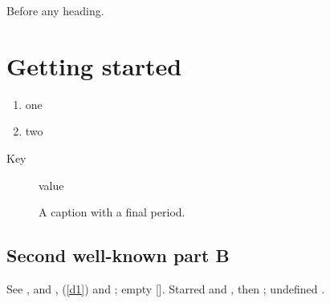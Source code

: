 \documentclass{article}
\begin{document}
Before any heading\label{none}.
\section{Getting started}\label{s1}
\begin{enumerate}\item one\label{i1} \item two\end{enumerate}
\begin{description}\item[Key] value\label{d1}\end{description}
\begin{figure}[h]\centering\caption{A caption with a final period.}\label{f1}\end{figure}
\subsection{Second well-known part B}\label{s2}
See ,  and ,  (\autoref{d1}) and ; empty [].
Starred  and , then ; undefined .
\end{document}
